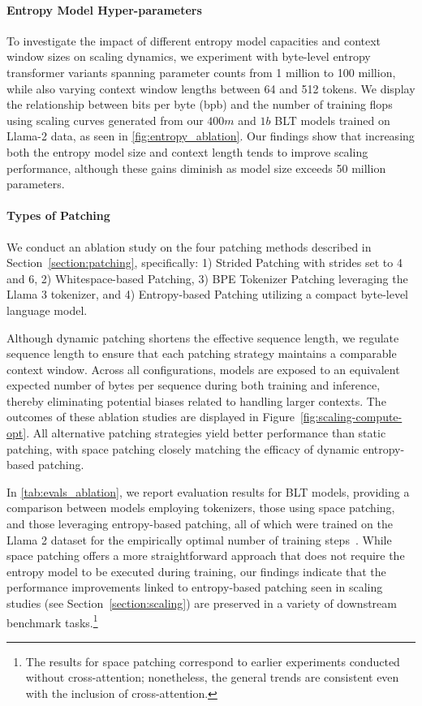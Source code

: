 \paragraph{Entropy Model Hyper-parameters} To investigate the impact of different entropy model capacities and context window sizes on scaling dynamics, we experiment with byte-level entropy transformer variants spanning parameter counts from 1 million to 100 million, while also varying context window lengths between 64 and 512 tokens. We display the relationship between bits per byte (bpb) and the number of training flops using scaling curves generated from our $400m$ and $1b$ {\textsc BLT} models trained on Llama-2 data, as seen in \autoref{fig:entropy_ablation}. Our findings show that increasing both the entropy model size and context length tends to improve scaling performance, although these gains diminish as model size exceeds 50 million parameters.

\paragraph{Types of Patching}

We conduct an ablation study on the four patching methods described in Section~\ref{section:patching}, specifically: 1) Strided Patching with strides set to 4 and 6, 2) Whitespace-based Patching, 3) BPE Tokenizer Patching leveraging the Llama 3 tokenizer, and 4) Entropy-based Patching utilizing a compact byte-level language model.

Although dynamic patching shortens the effective sequence length, we regulate sequence length to ensure that each patching strategy maintains a comparable context window. Across all configurations, models are exposed to an equivalent expected number of bytes per sequence during both training and inference, thereby eliminating potential biases related to handling larger contexts. The outcomes of these ablation studies are displayed in Figure~\ref{fig:scaling-compute-opt}. All alternative patching strategies yield better performance than static patching, with space patching closely matching the efficacy of dynamic entropy-based patching.

In \autoref{tab:evals_ablation}, we report evaluation results for {\textsc BLT} models, providing a comparison between models employing tokenizers, those using space patching, and those leveraging entropy-based patching, all of which were trained on the Llama 2 dataset for the empirically optimal number of training steps~\citep{dubey2024llama}. While space patching offers a more straightforward approach that does not require the entropy model to be executed during training, our findings indicate that the performance improvements linked to entropy-based patching seen in scaling studies (see Section~\ref{section:scaling}) are preserved in a variety of downstream benchmark tasks.\footnote{The results for space patching correspond to earlier experiments conducted without cross-attention; nonetheless, the general trends are consistent even with the inclusion of cross-attention.}

